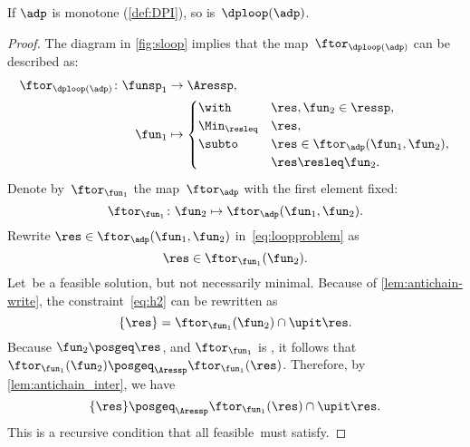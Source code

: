 \begin{proposition}
    \label{prop:loop-continuous}If $\adp$ is monotone (\cref{def:DPI}),
    so is~$\dploop(\adp)$.
\end{proposition}
\begin{proof}
    The diagram in \cref{fig:sloop} implies that the map~$\ftor_{\dploop(\adp)}$
    can be described as:
    \begin{align}
        \ftor_{\dploop(\adp)}\colon\funsp_{1} & \to\Aressp,\label{eq:loopproblem}\\
        \fun_{1} & \mapsto\begin{cases}
                              \with & \res,\fun_{2}\in\ressp,\\
                              \Min_{\resleq} & \res,\\
                              \subto & \res\in\ftor_{\adp}(\fun_{1},\fun_{2}),\\
                              & \res\resleq\fun_{2}.
        \end{cases}
    \end{align}
    Denote by~$\ftor_{\fun_{1}}$ the map~$\ftor_{\adp}$ with the
    first element fixed:
    \begin{equation*}
        \ftor_{\fun_{1}}\colon\fun_{2}\mapsto\ftor_{\adp}(\fun_{1},\fun_{2}).
    \end{equation*}
    Rewrite $\res\in\ftor_{\adp}(\fun_{1},\fun_{2})$ in~\cref{eq:loopproblem}
    as
    \begin{equation}
        \res\in\ftor_{\fun_{1}}(\fun_{2}).\label{eq:h2}
    \end{equation}
    Let~\res be a feasible solution, but not necessarily minimal.
    Because of \cref{lem:antichain-write}, the constraint~\cref{eq:h2} can
    be rewritten as
    \begin{equation}
        \{\res\}=\ftor_{\fun_{1}}(\fun_{2})\cap\upit\res.\label{eq:h3}
    \end{equation}
    Because $\fun_{2}\posgeq\res$, and $\ftor_{\fun_{1}}$ is \scottcontinuous,
    it follows that~$\ftor_{\fun_{1}}(\fun_{2})\posgeq_{\Aressp}\ftor_{\fun_{1}}(\res)$.
    Therefore, by \cref{lem:antichain_inter}, we have
    \begin{equation}
        \{\res\}\posgeq_{\Aressp}\ftor_{\fun_{1}}(\res)\cap\upit\res.\label{eq:fea}
    \end{equation}
    This is a recursive condition that all feasible~\res must satisfy.
    

\end{proof}
